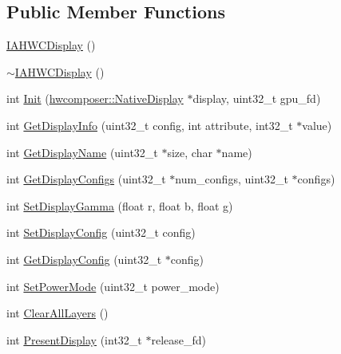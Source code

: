 \subsection*{Public Member Functions}
\begin{DoxyCompactItemize}
\item 
\mbox{\hyperlink{classhwcomposer_1_1IAHWC_1_1IAHWCDisplay_a19e2e52283f3cb2a9d75e5486a2d1746}{I\+A\+H\+W\+C\+Display}} ()
\item 
\mbox{\hyperlink{classhwcomposer_1_1IAHWC_1_1IAHWCDisplay_a506385cf1a72c499ed057af40a67eb08}{$\sim$\+I\+A\+H\+W\+C\+Display}} ()
\item 
int \mbox{\hyperlink{classhwcomposer_1_1IAHWC_1_1IAHWCDisplay_af339a6dc789ef156c41d19bf288f44e4}{Init}} (\mbox{\hyperlink{classhwcomposer_1_1NativeDisplay}{hwcomposer\+::\+Native\+Display}} $\ast$display, uint32\+\_\+t gpu\+\_\+fd)
\item 
int \mbox{\hyperlink{classhwcomposer_1_1IAHWC_1_1IAHWCDisplay_abac8759ae7be9065fb6a579e1b384c23}{Get\+Display\+Info}} (uint32\+\_\+t config, int attribute, int32\+\_\+t $\ast$value)
\item 
int \mbox{\hyperlink{classhwcomposer_1_1IAHWC_1_1IAHWCDisplay_af090eee5e7afcef5e96f8990815cf712}{Get\+Display\+Name}} (uint32\+\_\+t $\ast$size, char $\ast$name)
\item 
int \mbox{\hyperlink{classhwcomposer_1_1IAHWC_1_1IAHWCDisplay_a186346b470891a51643e415468ca5550}{Get\+Display\+Configs}} (uint32\+\_\+t $\ast$num\+\_\+configs, uint32\+\_\+t $\ast$configs)
\item 
int \mbox{\hyperlink{classhwcomposer_1_1IAHWC_1_1IAHWCDisplay_af334fba3fe056cf75884939ed8cf6fbc}{Set\+Display\+Gamma}} (float r, float b, float g)
\item 
int \mbox{\hyperlink{classhwcomposer_1_1IAHWC_1_1IAHWCDisplay_ae4a7bf880a35f4df5e649003f7f7a212}{Set\+Display\+Config}} (uint32\+\_\+t config)
\item 
int \mbox{\hyperlink{classhwcomposer_1_1IAHWC_1_1IAHWCDisplay_a7088d0da276eca2dc2b4458f20270258}{Get\+Display\+Config}} (uint32\+\_\+t $\ast$config)
\item 
int \mbox{\hyperlink{classhwcomposer_1_1IAHWC_1_1IAHWCDisplay_abff19b5001304bd1f0e3c582a409f672}{Set\+Power\+Mode}} (uint32\+\_\+t power\+\_\+mode)
\item 
int \mbox{\hyperlink{classhwcomposer_1_1IAHWC_1_1IAHWCDisplay_a5dcd39e69f99da275fa1d7b64f0dd3b2}{Clear\+All\+Layers}} ()
\item 
int \mbox{\hyperlink{classhwcomposer_1_1IAHWC_1_1IAHWCDisplay_a530a804beb0192c173f7311b35d0909f}{Present\+Display}} (int32\+\_\+t $\ast$release\+\_\+fd)

\end{DoxyCompactItemize}
